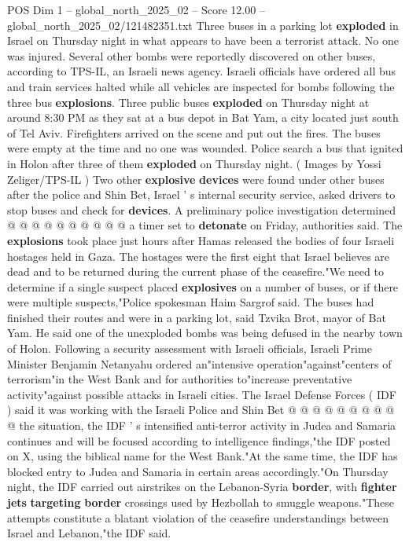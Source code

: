 \begin{textsample}{POS Dim 1 – global\_north\_2025\_02 – Score 12.00 – global\_north\_2025\_02/121482351.txt}  \label{ex:f1_pos_439}
Three buses in a parking lot \textbf{exploded} in Israel on Thursday night in what appears to have been a terrorist attack.
No one was injured.
Several other bombs were reportedly discovered on other buses, according to TPS-IL, an Israeli news agency.
Israeli officials have ordered all bus and train services halted while all vehicles are inspected for bombs following the three bus \textbf{explosions}.
Three public buses \textbf{exploded} on Thursday night at around 8:30 PM as they sat at a bus depot in Bat Yam, a city located just south of Tel Aviv.
Firefighters arrived on the scene and put out the fires.
The buses were empty at the time and no one was wounded.
Police search a bus that ignited in Holon after three of them \textbf{exploded} on Thursday night. ( Images by Yossi Zeliger/TPS-IL ) Two other \textbf{explosive} \textbf{devices} were found under other buses after the police and Shin Bet, Israel ' s internal security service, asked drivers to stop buses and check for \textbf{devices}.
A preliminary police investigation determined @ @ @ @ @ @ @ @ @ @ a timer set to \textbf{detonate} on Friday, authorities said.
The \textbf{explosions} took place just hours after Hamas released the bodies of four Israeli hostages held in Gaza.
The hostages were the first eight that Israel believes are dead and to be returned during the current phase of the ceasefire."We need to determine if a single suspect placed \textbf{explosives} on a number of buses, or if there were multiple suspects,"Police spokesman Haim Sargrof said.
The buses had finished their routes and were in a parking lot, said Tzvika Brot, mayor of Bat Yam.
He said one of the unexploded bombs was being defused in the nearby town of Holon.
Following a security assessment with Israeli officials, Israeli Prime Minister Benjamin Netanyahu ordered an"intensive operation"against"centers of terrorism"in the West Bank and for authorities to"increase preventative activity"against possible attacks in Israeli cities.
The Israel Defense Forces ( IDF ) said it was working with the Israeli Police and Shin Bet @ @ @ @ @ @ @ @ @ @ the situation, the IDF ' s intensified anti-terror activity in Judea and Samaria continues and will be focused according to intelligence findings,"the IDF posted on X, using the biblical name for the West Bank."At the same time, the IDF has blocked entry to Judea and Samaria in certain areas accordingly."On Thursday night, the IDF carried out airstrikes on the Lebanon-Syria \textbf{border}, with \textbf{fighter} \textbf{jets} \textbf{targeting} \textbf{border} crossings used by Hezbollah to smuggle weapons."These attempts constitute a blatant violation of the ceasefire understandings between Israel and Lebanon,"the IDF said.

\end{textsample}
